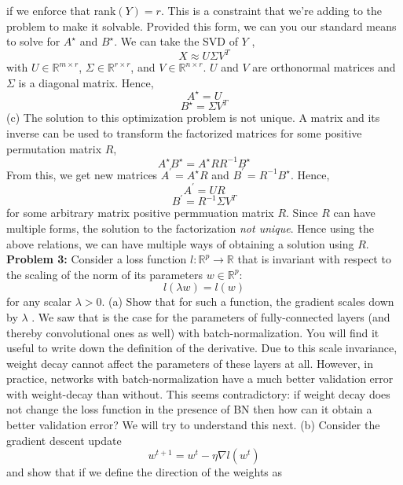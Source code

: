 \documentclass[12pt]{article}
\begin{document}
if we enforce that rank$(Y) = r$. This is a constraint that we're adding to the problem to make it solvable. Provided this form, we can you our standard means to solve for $A^{\star}$ and $B^{\star}$. We can take the SVD of $Y$ ,
$$X \approx U \Sigma V^{T} $$
with $U \in \mathbb{R}^{m\times r} $, $\Sigma \in \mathbb{R}^{r\times r}$, and $V  \in \mathbb{R}^{n \times r}$.  $U$ and $V$ are orthonormal matrices and $\Sigma$ is a diagonal matrix. Hence, 
$$ A^{\star}  = U$$
$$B^{\star} = \Sigma V^{T}$$
\newline \newline 
(c) The solution to this optimization problem is not unique.  A matrix and its inverse can be used to transform the factorized matrices for some positive permutation matrix $R$, 
$$ A^{\star} B^{\star} = A^{\star} RR^{-1}  B^{\star}$$
From this, we get new matrices $A^{\prime}  =   A^{\star} R $ and $B^{\prime}  = R^{-1}  B^{\star}$. Hence,  
$$A^{\prime}  =  U R  $$
$$ B^{\prime}  =  R^{-1}   \Sigma V^{T}    $$
for some arbitrary matrix positive permmuation matrix  $R$.  Since $R$ can have multiple forms, the solution to the factorization \emph{not unique}. Hence using the above relations, we can have multiple ways of obtaining a solution using $R$. \newline \newline 
\textbf{Problem 3:}  \newline
Consider a loss function $l: \mathbb{R}^{p} \rightarrow \mathbb{R}$  that is invariant with respect to the scaling of the norm of its parameters $w \in \mathbb{R}^{p}$:  
$$l (\lambda w) = l (w) $$
 for any scalar $\lambda > 0$.  
(a) Show that for such a function, the gradient scales down by $\lambda$ . We saw that is the case for the parameters of fully-connected layers (and thereby convolutional ones as well) with batch-normalization. You will find it useful to write down the definition of the derivative. \newline 
Due to this scale invariance, weight decay cannot affect the parameters of these layers at all. However, in practice, networks with batch-normalization have a much better validation error with weight-decay than without. This seems contradictory: if weight decay does not change the loss function in the presence of BN then how can it obtain a better validation error? We will try to understand this next. \newline \newline 
(b)  Consider the gradient descent update
$$ w^{t+1}  = w^{t} - \eta \nabla l (w^{t})  $$
and show that if we define the direction of the weights as 
\end{document}

